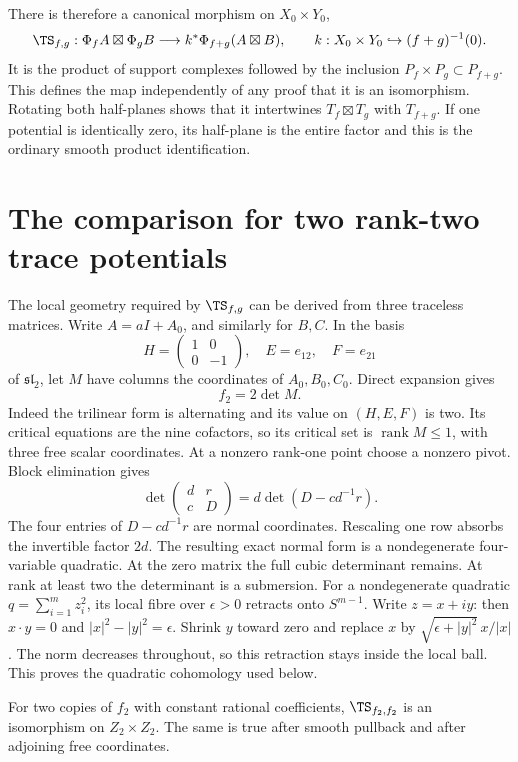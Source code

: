There is therefore a canonical morphism on $X_0\times Y_0$,
\[
 \TS_{f,g}:\Phi_fA\boxtimes\Phi_gB
       \longrightarrow k^*\Phi_{f+g}(A\boxtimes B),
 \qquad k:X_0\times Y_0\hookrightarrow(f+g)^{-1}(0).
\]
It is the product of support complexes followed by the inclusion
$P_f\times P_g\subset P_{f+g}$. This defines the map independently
of any proof that it is an isomorphism. Rotating both half-planes
shows that it intertwines $T_f\boxtimes T_g$ with $T_{f+g}$.
If one potential is identically zero, its half-plane is the entire
factor and this is the ordinary smooth product identification.

\section{The comparison for two rank-two trace potentials}
\label{ts22:sec:wall}

The local geometry required by $\TS_{f,g}$ can be derived from
three traceless matrices. Write $A=aI+A_0$, and similarly for $B,C$.
In the basis
\[
 H=\begin{pmatrix}1&0\\0&-1\end{pmatrix},\quad E=e_{12},\quad F=e_{21}
\]
of $\mathfrak{sl}_2$, let $M$ have columns the coordinates of
$A_0,B_0,C_0$. Direct expansion gives
\[
                      f_2=2\det M.
\]
Indeed the trilinear form is alternating and its value on $(H,E,F)$
is two. Its critical equations are the nine cofactors, so its
critical set is $\operatorname{rank}M\le1$, with three free scalar
coordinates. At a nonzero rank-one point choose a nonzero pivot.
Block elimination gives
\[
 \det\begin{pmatrix}d&r\\c&D\end{pmatrix}
       =d\det(D-cd^{-1}r).
\]
The four entries of $D-cd^{-1}r$ are normal coordinates. Rescaling
one row absorbs the invertible factor $2d$. The resulting exact
normal form is a nondegenerate four-variable quadratic. At the
zero matrix the full cubic determinant remains. At rank at least
two the determinant is a submersion.
For a nondegenerate quadratic $q=\sum_{i=1}^m z_i^2$, its local
fibre over $\epsilon>0$ retracts onto $S^{m-1}$. Write $z=x+iy$:
then $x\cdot y=0$ and $|x|^2-|y|^2=\epsilon$. Shrink $y$ toward
zero and replace $x$ by
$\sqrt{\epsilon+|y|^2}\,x/|x|$. The norm decreases throughout,
so this retraction stays inside the local ball. This proves the
quadratic cohomology used below.

\begin{lemma}
\label{ts22:lem:wall}
For two copies of $f_2$ with constant rational coefficients,
$\TS_{f_2,f_2}$ is an isomorphism on $Z_2\times Z_2$. The same is
true after smooth pullback and after adjoining free coordinates.
\end{lemma}

